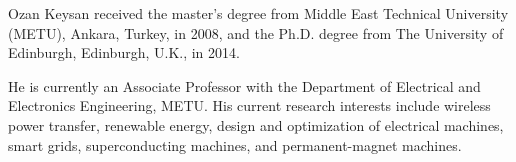 \documentclass[journal]{IEEEtran}
\begin{document}
\begin{IEEEbiography}
{Ozan Keysan} received the master’s degree from Middle East Technical University (METU), Ankara, Turkey, in 2008, and the Ph.D. degree from The University of Edinburgh, Edinburgh, U.K., in 2014. 

He is currently an Associate  Professor with the Department of Electrical and Electronics Engineering, METU. 
His current research interests include wireless power transfer, renewable energy, design and optimization of electrical machines, smart grids, superconducting machines, and permanent-magnet machines.
\end{IEEEbiography}

\end{document}
